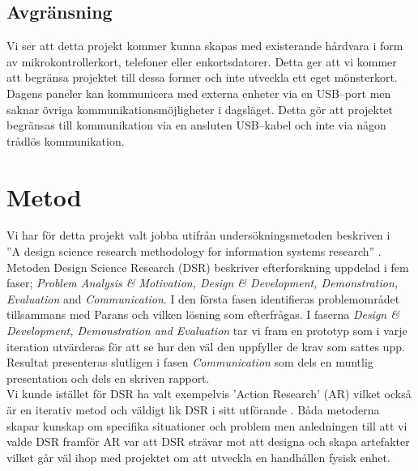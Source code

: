 \documentclass{article}
\begin{document}

        \subsection{Avgränsning} %
        \label{sub:avgransning}
            Vi ser att detta projekt kommer kunna skapas med existerande hårdvara i form av mikrokontrollerkort, telefoner eller enkortsdatorer. Detta ger att vi kommer att begränsa projektet till dessa former och inte utveckla ett eget mönsterkort.\\

            \noindent Dagens paneler kan kommunicera med externa enheter via en USB--port men saknar övriga kommunikationsmöjligheter i dagsläget. Detta gör att projektet begränsas till kommunikation via en ansluten USB--kabel och inte via någon trådlös kommunikation.

    \section{Metod} %
    \label{sec:metod}

        Vi har för detta projekt valt jobba utifrån undersökningsmetoden beskriven i \\
        ''A design science research methodology for information systems research'' \cite{method}. \\

        \noindent Metoden Design Science Research (DSR) beskriver efterforskning uppdelad i fem faser;
        \textit{Problem Analysis \& Motivation, Design \& Development, Demonstration, Evaluation} and \textit{Communication}. 
        I den första fasen identifieras problemområdet tillsammans med Parans och vilken lösning som efterfrågas. I faserna \textit{Design \& Development, Demonstration and Evaluation} tar vi fram en prototyp som i varje iteration utvärderas för att se hur den väl den uppfyller de krav som sattes upp.
        Resultat presenteras slutligen i fasen \textit{Communication} som dels en muntlig presentation och dels en skriven rapport. \\

        \noindent Vi kunde istället för DSR ha valt exempelvis 'Action Research' (AR) vilket också är en iterativ metod och väldigt lik DSR i sitt utförande \cite{designscience}. Båda metoderna skapar kunskap om specifika situationer och problem men anledningen till att vi valde DSR framför AR var att DSR strävar mot att designa och skapa artefakter vilket går väl ihop med projektet om att utveckla en handhållen fysisk enhet. \\
\end{document}
